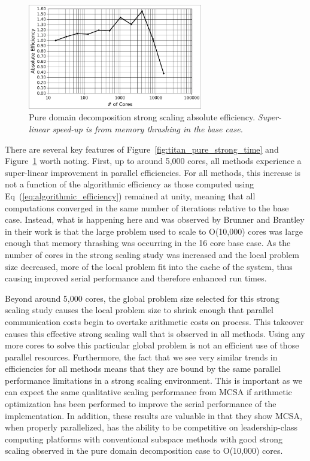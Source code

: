 \documentclass{snamc2013}
\begin{document}
\begin{figure}[h!]
  \begin{center}
    \includegraphics[width=3in]{titan_pure_strong.pdf}
  \end{center}
  \caption{Pure domain decomposition strong scaling absolute
    efficiency. \textit{Super-linear speed-up is from memory thrashing
      in the base case.}}
  \label{fig:titan_pure_strong}
\end{figure}

There are several key features of
Figure~\ref{fig:titan_pure_strong_time} and
Figure~\ref{fig:titan_pure_strong} worth noting. First, up to around
5,000 cores, all methods experience a super-linear improvement in
parallel efficiencies. For all methods, this increase is not a
function of the algorithmic efficiency as those computed using
Eq~(\ref{eq:algorithmic_efficiency}) remained at unity, meaning that
all computations converged in the same number of iterations relative
to the base case. Instead, what is happening here and was observed by
Brunner and Brantley in their work is that the large problem used to
scale to O(10,000) cores was large enough that memory thrashing was
occurring in the 16 core base case. As the number of cores in the
strong scaling study was increased and the local problem size
decreased, more of the local problem fit into the cache of the system,
thus causing improved serial performance and therefore enhanced run
times.

Beyond around 5,000 cores, the global problem size selected for this
strong scaling study causes the local problem size to shrink enough
that parallel communication costs begin to overtake arithmetic costs
on process. This takeover causes this effective strong scaling wall
that is observed in all methods. Using any more cores to solve this
particular global problem is not an efficient use of those parallel
resources. Furthermore, the fact that we see very similar trends in
efficiencies for all methods means that they are bound by the same
parallel performance limitations in a strong scaling environment. This
is important as we can expect the same qualitative scaling performance
from MCSA if arithmetic optimization has been performed to improve the
serial performance of the implementation. In addition, these results
are valuable in that they show MCSA, when properly parallelized, has
the ability to be competitive on leadership-class computing platforms
with conventional subspace methods with good strong scaling observed
in the pure domain decomposition case to O(10,000) cores.
\end{document}
